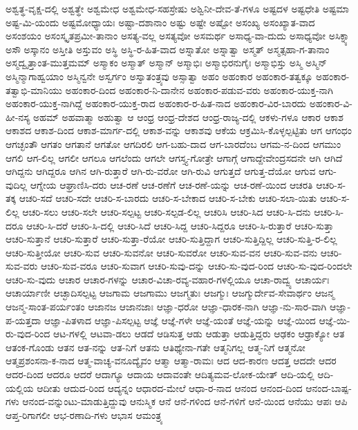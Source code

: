 {ಅಶ್ವತ್ಥ-ವೃಕ್ಷ-ದಲ್ಲಿ
ಅಶ್ವತ್ಥೇ
ಅಶ್ವಮೇಧ
ಅಶ್ವಮೇಧ-ಸಹಸ್ರೇಷು
ಅಶ್ವಿನೀ-ದೇವ-ತೆ-ಗಳೂ
ಅಷ್ಟದಳ
ಅಷ್ಟಧೇತಿ
ಅಷ್ಟಮಾ
ಅಷ್ಟ-ಮಿ-ಯಂದು
ಅಷ್ಟಮೋಧ್ಯಾಯಃ
ಅಷ್ಟಾ-ದಶಾನಾಂ
ಅಷ್ಟು
ಅಷ್ಟೇ
ಅಷ್ಟೋ
ಅಸಂಖ್ಯ
ಅಸಂಖ್ಯಾತ-ವಾದ
ಅಸಂಶಯಂ
ಅಸಂಸ್ಕೃತಪ್ರಮೀ-ತಾನಾಂ
ಅಸತ್ಯ-ವಲ್ಲ
ಅಸತ್ಯವೋ
ಅಸಮರ್ಥ
ಅಸಾಧ್ಯ-ವಾ-ದುದು
ಅಸಾಧ್ಯವೋ
ಅಸಿಕ್ನ್ಯಾ
ಅಸೌ
ಅಸ್ಕಾನಂ
ಅಸ್ತೀತಿ
ಅಸ್ತುವಂ
ಅಸ್ಥಿ
ಅಸ್ಥಿ-ರ-ಹಿತ-ವಾದ
ಅಸ್ನಾತೋ
ಅಸ್ನಾತ್ವಾ
ಅಸ್ಮತ್
ಅಸ್ಮತ್ಸಹಾ-ಗ-ತಾನಾಂ
ಅಸ್ಮದ್ವೃತ್ತಾಂತ-ಮುತ್ತಮಮ್
ಅಸ್ಮಾಕಂ
ಅಸ್ಮಾತ್
ಅಸ್ಮಾನ್
ಅಸ್ಮಾಭಿಃ
ಅಸ್ಮಾಭಿರನುಗೈಃ
ಅಸ್ಮಾಭಿಸ್ತು
ಅಸ್ಮಿ
ಅಸ್ಮಿನ್
ಅಸ್ಮಿನ್ಮಾಗಾಹ್ವಯಾಂ
ಅಸ್ಮಿನ್ವನೇ
ಅಸ್ವರ್ಗಂ
ಅಸ್ವಾತಂತ್ರ್ಯವು
ಅಸ್ಸಾತ್ವಾ
ಅಹಂ
ಅಹಂಕಾರ
ಅಹಂಕಾರ-ತತ್ವಕ್ಕೂ
ಅಹಂಕಾರ-ತತ್ವಾಭಿ-ಮಾನಿಯು
ಅಹಂಕಾರ-ದಿಂದ
ಅಹಂಕಾರ-ನಿ-ದಾನೇನ
ಅಹಂಕಾರ-ಪಡುವ-ವರು
ಅಹಂಕಾರ-ಯುಕ್ತ-ನಾಗಿ
ಅಹಂಕಾರ-ಯುಕ್ತ-ನಾಗಿದ್ದೆ
ಅಹಂಕಾರ-ಯುಕ್ತ-ರಾದ
ಅಹಂಕಾರ-ರ-ಹಿತ-ನಾದ
ಅಹಂಕಾರ-ವಿರ-ಬಾರದು
ಅಹಂಕಾರ-ವಿ-ಹೀ-ನಸ್ಯ
ಅಹಮ್
ಅಹವಾತ್ಮಾ
ಅಹುತ್ವಾ
ಆ
ಆಂಧ್ರ
ಆಂಧ್ರ-ದೇಶದ
ಆಂಧ್ರ-ರಾಜ್ಯ-ದಲ್ಲಿ
ಆಕಳು-ಗಳೂ
ಆಕಾರ
ಆಕಾಶ
ಆಕಾಶದ
ಆಕಾಶ-ದಿಂದ
ಆಕಾಶ-ಮಾರ್ಗ-ದಲ್ಲಿ
ಆಕಾಶ-ವನ್ನು
ಆಕಾಶವು
ಆಕೆಯ
ಆಕ್ರಮಿಸಿ-ಕೊಳ್ಳಲ್ಪಟ್ಟಿತು
ಆಗ
ಆಗಂಧಂ
ಆಗಚ್ಛಂತೌ
ಆಗತಂ
ಆಗತಾನೆ
ಆಗತೋ
ಆಗದಿರಲಿ
ಆಗ-ಬಹು-ದಾದ
ಆಗ-ಬಾರದೆಂಬ
ಆಗಮ-ನ-ದಿಂದ
ಆಗಮುಂ
ಆಗಲಿ
ಆಗ-ಲಿಲ್ಲ
ಆಗಲೀ
ಆಗಲೂ
ಆಗಲೆಂದು
ಆಗಲೇ
ಆಗಸ್ತ್ಯ-ಗೋತ್ರೇ
ಆಗಾಗ್ಗೆ
ಆಗಾದ್ದೇವೇಂದ್ರಸದನೇ
ಆಗಿ
ಆಗಿದೆ
ಆಗಿದ್ದನು
ಆಗಿದ್ದರೂ
ಆಗಿನ
ಆಗಿ-ರುತ್ತಾರೆ
ಆಗಿ-ರು-ವರೋ
ಆಗಿ-ರುವಿ
ಆಗುತ್ತದೆ
ಆಗುತ್ತ-ದೆಯೋ
ಆಗುವ
ಆಗು-ವುದಿಲ್ಲ
ಆಗ್ನೇಯ
ಆಘ್ರಾಣಿಸಿ-ದರು
ಆಚ-ರಣೆ
ಆಚ-ರಣೆಗೆ
ಆಚ-ರಣೆ-ಯನ್ನು
ಆಚ-ರಣೆ-ಯಿಂದ
ಆಚರತಿ
ಆಚರಿ-ಸ-ತಕ್ಕ
ಆಚರಿ-ಸದೆ
ಆಚರಿ-ಸದೇ
ಆಚರಿ-ಸ-ಬಾರದು
ಆಚರಿ-ಸ-ಬೇಕಾದ
ಆಚರಿ-ಸ-ಬೇಕು
ಆಚರಿ-ಸಲಾ-ಯಿತು
ಆಚರಿ-ಸ-ಲಿಲ್ಲ
ಆಚರಿ-ಸಲು
ಆಚರಿ-ಸಲೇ
ಆಚರಿ-ಸಲ್ಪಟ್ಟ
ಆಚರಿ-ಸಲ್ಪಡ-ಲಿಲ್ಲ
ಆಚರಿಸಿ
ಆಚರಿ-ಸಿದ
ಆಚರಿ-ಸಿ-ದನು
ಆಚರಿ-ಸಿ-ದರೂ
ಆಚರಿ-ಸಿ-ದರೆ
ಆಚರಿ-ಸಿ-ದಲ್ಲಿ
ಆಚರಿ-ಸಿದೆ
ಆಚರಿ-ಸಿದ್ದ
ಆಚರಿ-ಸಿದ್ದರೂ
ಆಚರಿ-ಸಿ-ರುತ್ತಾರೆ
ಆಚರಿ-ಸುತ್ತಾ
ಆಚರಿ-ಸುತ್ತಾನೆ
ಆಚರಿ-ಸುತ್ತಾರೆ
ಆಚರಿ-ಸುತ್ತಾ-ರೆಯೋ
ಆಚರಿ-ಸುತ್ತಿದ್ದಾಗ
ಆಚರಿ-ಸುತ್ತಿದ್ದಿಲ್ಲ
ಆಚರಿ-ಸುತ್ತಿ-ರ-ಲಿಲ್ಲ
ಆಚರಿ-ಸುತ್ತೀಯೋ
ಆಚರಿ-ಸುವ
ಆಚರಿ-ಸುವನೋ
ಆಚರಿ-ಸುವರೋ
ಆಚರಿ-ಸುವ-ವನ
ಆಚರಿ-ಸುವ-ವನು
ಆಚರಿ-ಸುವ-ವರು
ಆಚರಿ-ಸುವ-ವರೂ
ಆಚರಿ-ಸುವಾಗ
ಆಚರಿ-ಸುವು-ದನ್ನು
ಆಚರಿ-ಸು-ವುದ-ರಿಂದ
ಆಚರಿ-ಸು-ವುದ-ರಿಂದಲೇ
ಆಚರಿ-ಸು-ವುದು
ಆಚಾರ
ಆಚಾರ-ಗಳನ್ನು
ಆಚಾರ-ವಿಚಾ-ರವ್ಯ-ವಹಾರ-ಗಳಲ್ಲಿಯೂ
ಆಚಾ-ರಾದ್ವ್ಯ
ಆಚಾರ್ಯಃ
ಆಚಾರ್ಯಾಣೀ
ಆಚ್ಛಾದಿಸಲ್ಪಟ್ಟ
ಆಜಗಾಮ
ಆಜಗಾಮು
ಆಜಗ್ಮತುಃ
ಆಜಗ್ಮುಃ
ಆಜಗ್ಮುರ್ದೇವ-ಸೇವಾರ್ಥಂ
ಆಜನ್ಮ
ಆಜನ್ಮ-ಸಾಂತ-ಪರ್ಯಂತಂ
ಆಜಾನಜ
ಆಜಾನಜಾಃ
ಆಜ್ಞಾ-ಧರೋ
ಆಜ್ಞಾ-ಧಾರಕ-ನಾಗಿ
ಆಜ್ಞಾ-ನು-ಸಾರ-ವಾಗಿ
ಆಜ್ಞಾ-ಪ-ಯತ್ತದಾ
ಆಜ್ಞಾ-ಪಿತಳಾದ
ಆಜ್ಞಾ-ಪಿಸಲ್ಪಟ್ಟ
ಆಜ್ಞೆ
ಆಜ್ಞೆ-ಗಳೇ
ಆಜ್ಞೆ-ಯಂತೆ
ಆಜ್ಞೆ-ಯನ್ನು
ಆಜ್ಞೆ-ಯಿಂದ
ಆಜ್ಞೆ-ಯಿ-ರು-ವುದ-ರಿಂದ
ಆಟ-ಗಳಲ್ಲಿ
ಆಟವಾ-ಡಲು
ಆಡದೆ
ಆಡಿಸುತ್ತ
ಆಡು
ಆಡುತ್ತಾ
ಆಡುತ್ತಿದ್ದರು
ಆಢಕಂ
ಆಢ್ರಾಕ್ಯೋ
ಆತ
ಆತಂಕ-ಗೊಂಡು
ಆತನ
ಆತ-ನನ್ನು
ಆತ-ನಿಗೆ
ಆತನು
ಆತಿಥ್ಯೇನಾ-ಗತೇ
ಆತ್ಮನಿಗಲ್ಲ
ಆತ್ಮ-ನಿಗೆ
ಆತ್ಮನೋ
ಆತ್ಮಪ್ರಶಂಸನಾ-ಕ-ನಾದ
ಆತ್ಮ-ವಾಚ್ಯ-ವನೂದ್ಯೈವಂ
ಆತ್ಮಾ
ಆತ್ಮಾ-ರಾಮಃ
ಆದ
ಆದ-ಕಾರಣ
ಆದತ್ತ
ಆದದೇ
ಆದರ
ಆದರ-ದಿಂದ
ಆದರೂ
ಆದರೆ
ಆದಾಗ್ಯೂ
ಆದಾಯ
ಆದಾವಂತೇ
ಆದಿತ್ಯಮವ-ಲೋಕ-ಯೇತ್
ಆದಿ-ಯಲ್ಲಿ
ಆದಿ-ಯಲ್ಲಿಯ
ಆದೀತು
ಆದುದ-ರಿಂದ
ಆದ್ಯನ್ನಂ
ಆಧಾರದ-ಮೇಲೆ
ಆಧಾ-ರ-ನಾದ
ಆನಂದ
ಆನಂದ-ದಿಂದ
ಆನಂದ-ಬಾಷ್ಪ-ಗಳು
ಆನಂದ-ವನ್ನುಂಟು-ಮಾಡುತ್ತಿದ್ದುವು
ಆನುಸ್ಮಿಕ
ಆನೆ
ಆನೆ-ಗಳಿಂದ
ಆನೆ-ಗಳಿಗೆ
ಆನೆ-ಯಿಂದ
ಆನೆಯು
ಆಪಃ
ಆಪಿ
ಆಪ್ತ-ರಿಗಾಗಲೀ
ಆಭ-ರಣಾದಿ-ಗಳು
ಆಭಾಸ
ಆಮಂತ್ರ್ಯ
}
